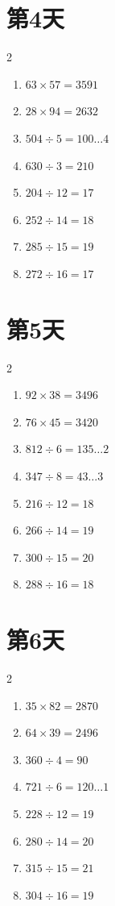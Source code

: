 \documentclass[12pt]{ctexart}
\begin{document}
	\section*{第4天}
	\begin{multicols}{2}
		\begin{enumerate}[itemsep=0pt]
			\item $63 \times 57 = 3591$
			\item $28 \times 94 = 2632$
			\item $504 \div 5 = 100\ldots 4$
			\item $630 \div 3 = 210$
			\item $204 \div 12 = 17$
			\item $252 \div 14 = 18$
			\item $285 \div 15 = 19$
			\item $272 \div 16 = 17$
		\end{enumerate}
	\end{multicols}
	
	\section*{第5天}
	\begin{multicols}{2}
		\begin{enumerate}[itemsep=0pt]
			\item $92 \times 38 = 3496$
			\item $76 \times 45 = 3420$
			\item $812 \div 6 = 135\ldots 2$
			\item $347 \div 8 = 43\ldots 3$
			\item $216 \div 12 = 18$
			\item $266 \div 14 = 19$
			\item $300 \div 15 = 20$
			\item $288 \div 16 = 18$
		\end{enumerate}
	\end{multicols}
	
	\section*{第6天}
	\begin{multicols}{2}
		\begin{enumerate}[itemsep=0pt]
			\item $35 \times 82 = 2870$
			\item $64 \times 39 = 2496$
			\item $360 \div 4 = 90$
			\item $721 \div 6 = 120\ldots 1$
			\item $228 \div 12 = 19$
			\item $280 \div 14 = 20$
			\item $315 \div 15 = 21$
			\item $304 \div 16 = 19$
		\end{enumerate}
	\end{multicols}
	
\end{document}
